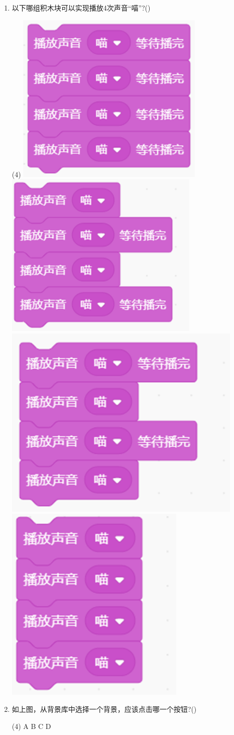 \documentclass[10pt, a4paper]{article}
\begin{document}
\begin{enumerate}
        \item 以下哪组积木块可以实现播放4次声音“喵”?(\qquad)
        \begin{tasks}(4)
            \task \includegraphics[width=.15\textwidth]{10a.png}
            \task \includegraphics[width=.16\textwidth]{10b.png}
            \task \includegraphics[width=.17\textwidth]{10c.png}
            \task \includegraphics[width=.125\textwidth]{10d.png}
        \end{tasks}

        \item 如上图，从背景库中选择一个背景，应该点击哪一个按钮?(\qquad)
        \begin{tasks}(4)
            \task A
            \task B
            \task C
            \task D
        \end{tasks}
        

\end{enumerate}
\end{document}
